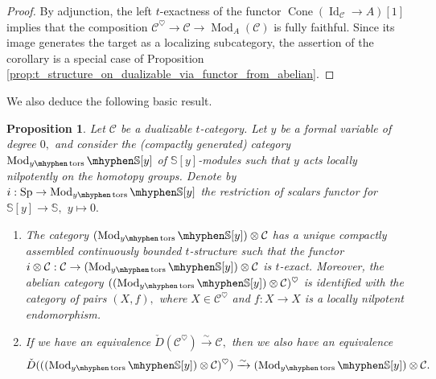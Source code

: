\documentclass[11pt,leqno]{amsart}
\newtheorem{prop}[theo]{Proposition}
\numberwithin{equation}{section}
\def\bS{\mathbb{S}}
\newcommand{\hy}{\mhyphen}
\newcommand{\xto}{\xrightarrow}
\newcommand{\Cone}{\operatorname{Cone}}
\newcommand{\cC}{{\mathcal C}}
\newcommand{\Id}{\operatorname{Id}}
\newcommand{\Sp}{\operatorname{Sp}}
\newcommand{\tors}{\operatorname{tors}}
\newcommand{\Mod}{\operatorname{Mod}}
\begin{document}
\begin{proof}
By adjunction, the left $t$-exactness of the functor $\Cone(\Id_{\cC}\to A)[1]$ implies that the composition $\cC^{\heartsuit}\to \cC\to\Mod_A(\cC)$ is fully faithful. Since its image generates the target as a localizing subcategory, the assertion of the corollary is a special case of Proposition \ref{prop:t_structure_on_dualizable_via_functor_from_abelian}.
\end{proof}

We also deduce the following basic result.

\begin{prop}\label{prop:t_structure_on_nilpotent_endomorphisms}
	Let $\cC$ be a dualizable $t$-category. Let $y$ be a formal variable of degree $0,$ and consider the (compactly generated) category $\Mod_{y\hy\tors}\hy \bS[y]$ of $\bS[y]$-modules such that $y$ acts locally nilpotently on the homotopy groups. Denote by $i:\Sp\to \Mod_{y\hy\tors}\hy \bS[y]$ the restriction of scalars functor for $\bS[y]\to\bS,$ $y\mapsto 0.$ 
	\begin{enumerate}[label=(\roman*),ref=(\roman*)]
		\item The category $(\Mod_{y\hy\tors}\hy \bS[y])\otimes \cC$ has a unique compactly assembled continuously bounded $t$-structure such that the functor $i\otimes\cC:\cC\to (\Mod_{y\hy\tors}\hy \bS[y])\otimes \cC$ is $t$-exact. Moreover, the abelian category $((\Mod_{y\hy\tors}\hy \bS[y])\otimes \cC)^{\heartsuit}$ is identified with the category of pairs $(X,f),$ where $X\in\cC^{\heartsuit}$ and $f:X\to X$ is a locally nilpotent endomorphism. \label{t_structure_for_nilpotent_endomorphisms}
		\item If we have an equivalence $\check{D}(\cC^{\heartsuit})\xto{\sim}\cC,$ then we also have an equivalence
		\begin{equation*}
		\check{D}(((\Mod_{y\hy\tors}\hy \bS[y])\otimes \cC)^{\heartsuit})\xto{\sim} (\Mod_{y\hy\tors}\hy \bS[y])\otimes \cC.
		\end{equation*} \label{realization_is_equivalence_for_nil_endomorphisms}
	\end{enumerate}
\end{prop}
\end{document}
